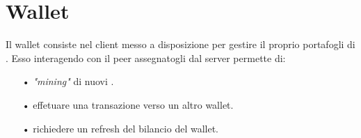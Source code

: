 \section{Wallet}
Il wallet consiste nel client messo a disposizione per gestire il proprio portafogli di \vitcoin. Esso interagendo con il peer assegnatogli dal server permette di:
\begin{itemize}
\item[•] \textit{"mining"} di nuovi \vitcoin. 
\item[•] effetuare una transazione verso un altro wallet.
\item[•] richiedere un refresh del bilancio del wallet.
\end{itemize}
